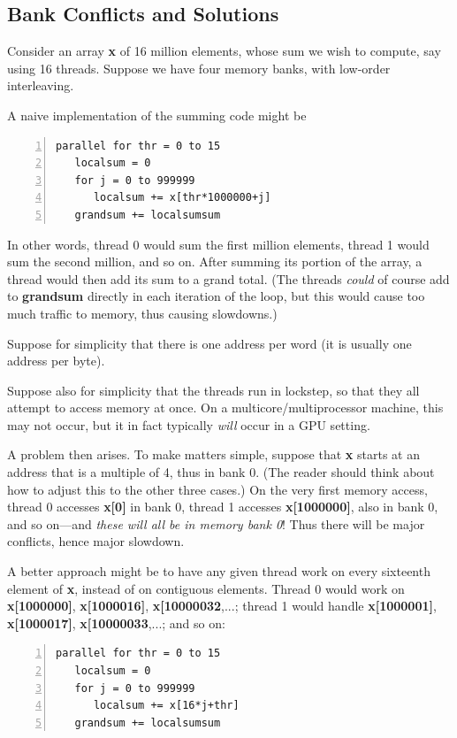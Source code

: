 \subsection{Bank Conflicts and Solutions}
\label{bankclash}

Consider an array {\bf x} of 16 million elements, whose sum we wish to
compute, say using 16 threads.  Suppose we have four memory banks, with
low-order interleaving.

A naive implementation of the summing code might be

\begin{Verbatim}[fontsize=\relsize{-2},numbers=left]
parallel for thr = 0 to 15
   localsum = 0
   for j = 0 to 999999
      localsum += x[thr*1000000+j]
   grandsum += localsumsum
\end{Verbatim}

In other words, thread 0 would sum the first million elements, thread 1
would sum the second million, and so on.  After summing its portion of
the array, a thread would then add its sum to a grand total.  (The
threads {\it could} of course add to {\bf grandsum} directly in each
iteration of the loop, but this would cause too much traffic to memory,
thus causing slowdowns.)

Suppose for simplicity that there is one address per word (it is usually
one address per byte).

Suppose also for simplicity that the threads run in lockstep, so that they
all attempt to access memory at once.  On a multicore/multiprocessor
machine, this may not occur, but it in fact typically {\it will} occur
in a GPU setting.

A problem then arises.  To make matters simple, suppose that {\bf x}
starts at an address that is a multiple of 4, thus in bank 0.  (The
reader should think about how to adjust this to the other three cases.)
On the very first memory access, thread 0 accesses {\bf x[0]} in bank 0,
thread 1 accesses {\bf x[1000000]}, also in bank 0, and so on---and {\it
these will all be in memory bank 0}!  Thus there will be major
conflicts, hence major slowdown.

A better approach might be to have any given thread work on every
sixteenth element of {\bf x}, instead of on contiguous elements.  Thread
0 would work on {\bf x[1000000]}, {\bf x[1000016]}, {\bf
x[10000032},...; thread 1 would handle {\bf x[1000001]}, {\bf
x[1000017]}, {\bf x[10000033},...; and so on:

\begin{Verbatim}[fontsize=\relsize{-2},numbers=left]
parallel for thr = 0 to 15
   localsum = 0
   for j = 0 to 999999
      localsum += x[16*j+thr]
   grandsum += localsumsum
\end{Verbatim}

